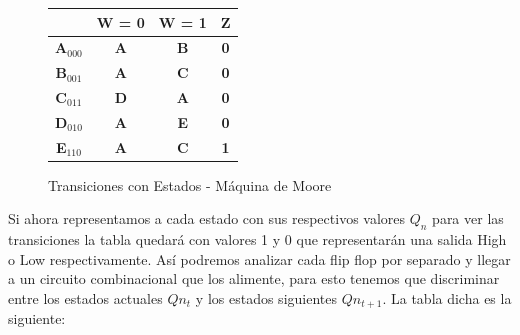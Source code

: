 \begin{figure}[H]
	\begin{center}
		\begin{tabular}{c|c|c|c|}
		\cline{2-4}
		\textbf{} & \textbf{W = 0} & \textbf{W = 1} & \textbf{Z} \\ \hline
		\multicolumn{1}{|c|}{\textbf{A$_{000}$}} & \textbf{A} & \textbf{B} & \textbf{0} \\ \hline
		\multicolumn{1}{|c|}{\textbf{B$_{001}$}} & \textbf{A} & \textbf{C} & \textbf{0} \\ \hline
		\multicolumn{1}{|c|}{\textbf{C$_{011}$}} & \textbf{D} & \textbf{A} & \textbf{0} \\ \hline
		\multicolumn{1}{|c|}{\textbf{D$_{010}$}} & \textbf{A} & \textbf{E} & \textbf{0} \\ \hline
		\multicolumn{1}{|c|}{\textbf{E$_{110}$}} & \textbf{A} & \textbf{C} & \textbf{1} \\ \hline
		\end{tabular}
	\caption{Transiciones con Estados - Máquina de Moore} 
	\label{2_fig1}
	\end{center}
\end{figure}
Si ahora representamos a cada estado con sus respectivos valores $Q_n$ para ver las transiciones la tabla quedar\'a con valores 1 y 0 que representar\'an una salida High o Low respectivamente. As\'i podremos analizar cada flip flop por separado y llegar a un circuito combinacional que los alimente, para esto tenemos que discriminar entre los estados actuales $Q{n_{t}}$ y los estados siguientes $Q{n_{t+1}}$. La tabla dicha es la siguiente:


